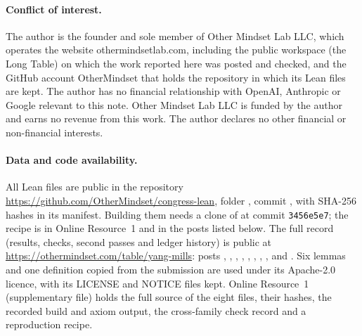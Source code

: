 \documentclass[11pt,a4paper]{article}
\theoremstyle{plain}
\begin{document}
\paragraph{Conflict of interest.} The author is the founder and sole member of Other Mindset Lab LLC, which operates the website othermindsetlab.com, including the public workspace (the Long Table) on which the work reported here was posted and checked, and the GitHub account OtherMindset that holds the repository in which its Lean files are kept. The author has no financial relationship with OpenAI, Anthropic or Google relevant to this note. Other Mindset Lab LLC is funded by the author and earns no revenue from this work. The author declares no other financial or non-financial interests.

\paragraph{Data and code availability.} All Lean files are public in the repository \url{https://github.com/OtherMindset/congress-lean}, folder , commit , with SHA-256 hashes in its manifest. Building them needs a clone of  at commit \texttt{3456e5e7}; the recipe is in Online Resource~1 and in the posts listed below. The full record (results, checks, second passes and ledger history) is public at \url{https://othermindset.com/table/yang-mills}: posts , , , , , , , ,  and . Six lemmas and one definition copied from the submission are used under its Apache-2.0 licence, with its LICENSE and NOTICE files kept. Online Resource~1 (supplementary file) holds the full source of the eight files, their hashes, the recorded build and axiom output, the cross-family check record and a reproduction recipe.
\end{document}

